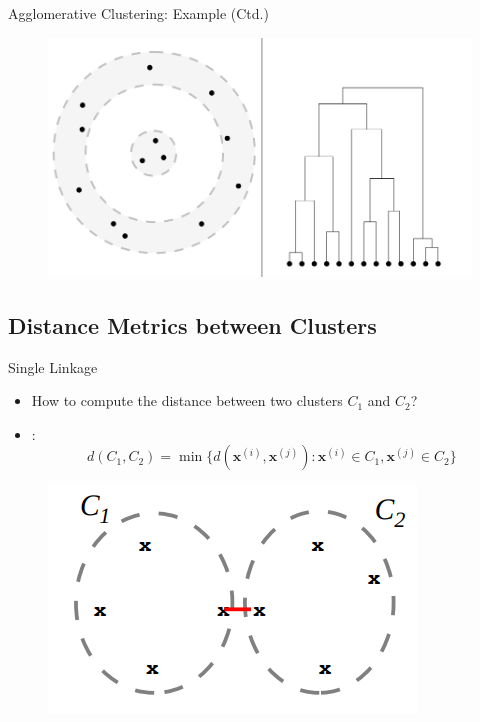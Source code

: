 \begin{frame}{Agglomerative Clustering: Example (Ctd.)}{}
	\begin{figure}
		\centering
		\includegraphics[scale=0.4]{12_clustering/02_img/aggl_clust_6}
	\end{figure}
\end{frame}


\subsection{Distance Metrics between Clusters}

\begin{frame}{Single Linkage}{}
	\begin{itemize}
		\item How to compute the distance between two clusters $C_1$ and $C_2$?
		\item {}:
		\begin{equation*}
			d(C_1, C_2) = \min\{ d(\bm{x}^{(i)}, \bm{x}^{(j)}) : \bm{x}^{(i)} \in C_1, \bm{x}^{(j)} \in C_2 \}
		\end{equation*}
	\end{itemize}

	\begin{figure}
		\centering
		\includegraphics[scale=0.4]{12_clustering/02_img/single_linkage}
	\end{figure}
\end{frame}


